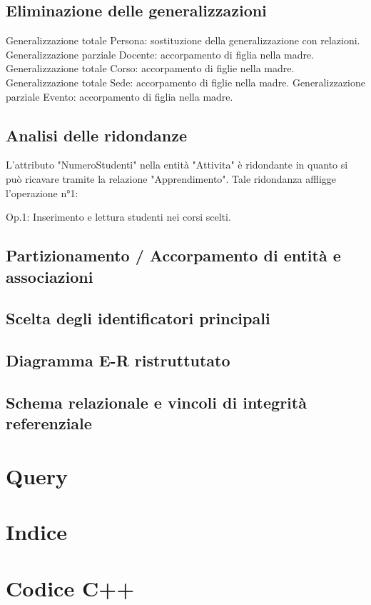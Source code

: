 \documentclass[11pt]{article}
\begin{document}
	\subsection{Eliminazione delle generalizzazioni}
		Generalizzazione totale Persona: sostituzione della generalizzazione con relazioni.
		Generalizzazione parziale Docente: accorpamento di figlia nella madre.
		Generalizzazione totale Corso: accorpamento di figlie nella madre.
		Generalizzazione totale Sede: accorpamento di figlie nella madre.
		Generalizzazione parziale Evento: accorpamento di figlia nella madre.
	\subsection{Analisi delle ridondanze}
		L'attributo "NumeroStudenti" nella entità "Attivita" è ridondante in quanto si può ricavare tramite la relazione "Apprendimento".
		Tale ridondanza affligge l'operazione n°1:
		
		Op.1: Inserimento e lettura studenti nei corsi scelti.
	\subsection{Partizionamento / Accorpamento di entità e associazioni}
	\subsection{Scelta degli identificatori principali}
	\subsection{Diagramma E-R ristruttutato}
	\subsection{Schema relazionale e vincoli di integrità referenziale}
\section{Query}
\section{Indice}
\section{Codice C++}
\end{document}
